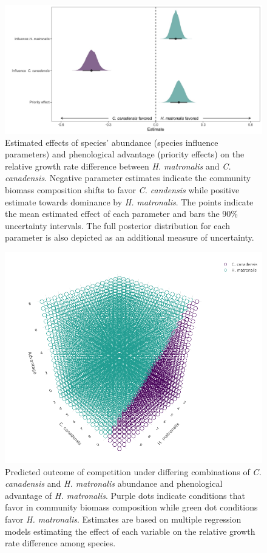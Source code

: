 \documentclass{article}[11pt]
\begin{document}
\begin{figure}[h!]
    \centering
\includegraphics[width=\textwidth]{..//figure/mu_plots.jpeg}
    \caption{Estimated effects of species' abundance (species influence parameters) and phenological advantage (priority effects) on the relative growth rate difference between \textit{H. matronalis} and \textit{C. canadensis}. Negative parameter estimates indicate the community biomass composition shifts to favor \textit{C. candensis} while positive estimate towards dominance by \textit{ H. matronalis}. The points indicate the mean estimated effect of each parameter and bars the 90\% uncertainty intervals. The full posterior distribution for each parameter is also depicted as an additional measure of uncertainty.} 
    \label{fig:RGRD}
\end{figure}

\begin{figure}[h!]
    \centering
\includegraphics[width=\textwidth]{..//figure/3dconnolly2.png}
   \caption{Predicted outcome of competition under differing combinations of \textit{C. canadensis} and \textit{H. matronalis} abundance and phenological advantage of \textit{H. matronalis}. Purple dots indicate conditions that favor   in community biomass composition while green dot conditions favor \textit{H. matronalis}. Estimates are based on multiple regression models estimating the effect of each variable on the relative growth rate difference among species.} 
   \label{fig:3D}
\end{figure}
\end{document}
